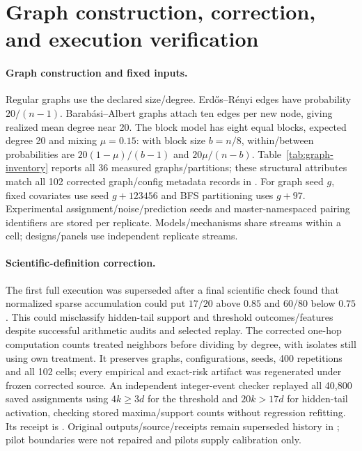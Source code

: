 \section{Graph construction, correction, and execution verification}
\label{app:execution}
\paragraph{Graph construction and fixed inputs.}
Regular graphs use the declared size/degree. Erd\H{o}s--R\'enyi edges have probability $20/(n-1)$. Barab\'asi--Albert graphs attach ten edges per new node, giving realized mean degree near 20. The block model has eight equal blocks, expected degree 20 and mixing $\mu=0.15$: with block size $b=n/8$, within/between probabilities are $20(1-\mu)/(b-1)$ and $20\mu/(n-b)$. Table~\ref{tab:graph-inventory} reports all 36 measured graphs/partitions; these structural attributes match all 102 corrected graph/config metadata records in . For graph seed $g$, fixed covariates use seed $g+123456$ and BFS partitioning uses $g+97$. Experimental assignment/noise/prediction seeds and master-namespaced pairing identifiers are stored per replicate. Models/mechanisms share streams within a cell; designs/panels use independent replicate streams.


\paragraph{Scientific-definition correction.}
The first full execution was superseded after a final scientific check found that normalized sparse accumulation could put $17/20$ above $0.85$ and $60/80$ below $0.75$. This could misclassify hidden-tail support and threshold outcomes/features despite successful arithmetic audits and selected replay. The corrected one-hop computation counts treated neighbors before dividing by degree, with isolates still using own treatment. It preserves graphs, configurations, seeds, 400 repetitions and all 102 cells; every empirical and exact-risk artifact was regenerated under frozen corrected source. An independent integer-event checker replayed all 40,800 saved assignments using $4k\geq3d$ for the threshold and $20k>17d$ for hidden-tail activation, checking stored maxima/support counts without regression refitting. Its receipt is . Original outputs/source/receipts remain superseded history in ; pilot boundaries were not repaired and pilots supply calibration only.

